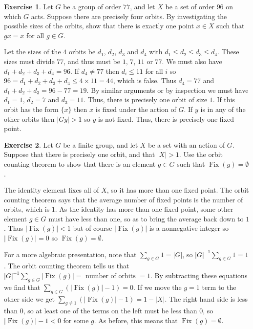 \documentclass{amsart}
\DeclareMathOperator{\Fix}{Fix}
\renewcommand{\:}{\colon}
\newcommand{\tm}{\times}
\theoremstyle{definition}
\newtheorem{exercise}{Exercise}
\newenvironment{solution}{{\noindent\bf Solution:}}{}
\begin{document}
\begin{exercise}
 Let $G$ be a group of order $77$, and let $X$ be a set of order $96$
 on which $G$ acts.  Suppose there are precisely four orbits.  By
 investigating the possible sizes of the orbits, show that there is
 exactly one point $x\in X$ such that $gx=x$ for all $g\in G$.
\end{exercise}
\begin{solution}
 Let the sizes of the $4$ orbits be $d_1$, $d_2$, $d_3$ and $d_4$ with
 $d_1\leq d_2\leq d_3\leq d_4$.  These sizes must divide $77$, and
 thus must be $1$, $7$, $11$ or $77$.  We must also have
 $d_1+d_2+d_3+d_4=96$.  If $d_4\neq 77$ then $d_i\leq 11$ for all $i$
 so $96=d_1+d_2+d_3+d_4\leq 4\tm 11=44$, which is false.  Thus
 $d_4=77$ and $d_1+d_2+d_3=96-77=19$.  By similar arguments or by
 inspection we must have $d_1=1$, $d_2=7$ and $d_3=11$.  Thus, there
 is precisely one orbit of size $1$.  If this orbit has the form
 $\{x\}$ then $x$ is fixed under the action of $G$.  If $y$ is in any
 of the other orbits then $|Gy|>1$ so $y$ is not fixed.  Thus, there
 is precisely one fixed point.
\end{solution}

\begin{exercise}
 Let $G$ be a finite group, and let $X$ be a set with an action of
 $G$.  Suppose that there is precisely one orbit, and that $|X|>1$.
 Use the orbit counting theorem to show that there is an element $g\in
 G$ such that $\Fix(g)=\emptyset$.
\end{exercise}
\begin{solution}
 The identity element fixes all of $X$, so it has more than one fixed
 point.  The orbit counting theorem says that the average number of
 fixed points is the number of orbits, which is $1$.  As the identity
 has more than one fixed point, some other element $g\in G$ must have
 less than one, so as to bring the average back down to $1$.  Thus
 $|\Fix(g)|<1$ but of course $|\Fix(g)|$ is a nonnegative integer so
 $|\Fix(g)|=0$ so $\Fix(g)=\emptyset$.  

 For a more algebraic presentation, note that $\sum_{g\in G}1=|G|$, so
 $|G|^{-1}\sum_{g\in G}1=1$.  The orbit counting theorem tells us that
 $|G|^{-1}\sum_{g\in G}|\Fix(g)|=\text{ number of orbits }=1$.  By
 subtracting these equations we find that
 $\sum_{g\in G}(|\Fix(g)|-1)=0$.  If we move the $g=1$ term to the
 other side we get $\sum_{g\neq 1}(|\Fix(g)|-1)=1-|X|$.  The right
 hand side is less than $0$, so at least one of the terms on the left
 must be less than $0$, so $|\Fix(g)|-1<0$ for some $g$.  As before,
 this means that $\Fix(g)=\emptyset$.
\end{solution}
\end{document}
